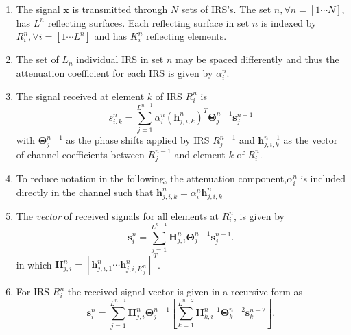 \documentclass[12pt,a4paper]{report}
\begin{document}
\begin{enumerate}
\item 
The signal $\mathbf{x}$ is transmitted through $N$ sets of IRS's. The set $n, \forall n = [1 \cdots N]$, has $L^n$ reflecting surfaces. Each reflecting surface in set $n$ is indexed by $R^n_{i}, \forall i = [1\cdots L^n]$ and has $K_{i}^{n}$ reflecting elements.
\item
The set of $L_n$ individual IRS in set $n$ may be spaced differently and thus the attenuation coefficient for each IRS is given by $\alpha_i^n$.
\item 
 The  signal received at element $k$ of IRS $R_i^n$ is 
\begin{equation}
s^{n}_{i,k} = \sum_{j = 1}^{L^{n-1}} \alpha_i^n (\mathbf{h}^{n}_{j,i,k})^T \boldsymbol{\Theta}^{n-1}_{j}\mathbf{s}^{n-1}_{j}
\end{equation}
with $\boldsymbol{\Theta}^{n-1}_{j}$ as the phase shifts applied by IRS $R_j^{n-1}$ and $\mathbf{h}^{n-1}_{j,i,k}$ as the vector of channel coefficients between $R_j^{n-1}$ and element $k$ of $R_i^n$.

\item
	To reduce notation in the following, the attenuation component,$\alpha_i^n$ is included directly in the channel such that $ \mathbf{h}^{n}_{j,i,k} = \alpha_i^n \mathbf{h}^{n}_{j,i,k}$
\item
The \emph{vector} of received signals for all elements at $R^n_{i}$, is given by
\begin{equation}\label{received_vector}
\mathbf{s}^{n}_{i} = \sum_{j = 1}^{L^{n-1}} \mathbf{H}^{n}_{j,i}\boldsymbol{\Theta}^{n-1}_{j}\mathbf{s}^{n-1}_{j}.
\end{equation}
in which $\mathbf{H}^{n}_{j,i} = [\mathbf{h}^{n}_{j,i,1} \cdots \mathbf{h}^{n}_{j,i,K_{j}^{n}}]^T$.



\item For IRS $R^n_{i}$ the received signal vector is given in a recursive form as
\begin{equation}\label{general_received}
\mathbf{s}^{n}_{i} = \sum_{j = 1}^{L^{n-1}}  \mathbf{H}^{n}_{j,i}\boldsymbol{\Theta}^{n-1}_{j} \left[
\sum_{k = 1}^{L^{n-2}}  \mathbf{H}^{n-1}_{k,i}\boldsymbol{\Theta}^{n-2}_{k}\mathbf{s}^{n-2}_{k} \right].
\end{equation}


\end{enumerate}
\end{document}
